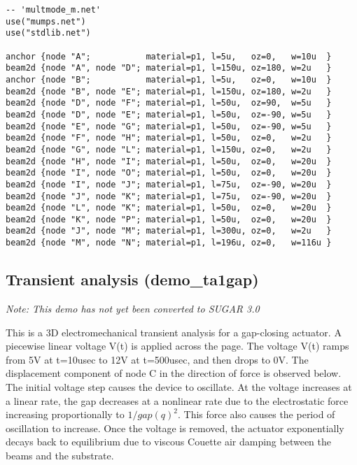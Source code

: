 \begin{verbatim}
-- 'multmode_m.net' 
use("mumps.net")
use("stdlib.net")

anchor {node "A";           material=p1, l=5u,   oz=0,   w=10u  }
beam2d {node "A", node "D"; material=p1, l=150u, oz=180, w=2u   }
anchor {node "B";           material=p1, l=5u,   oz=0,   w=10u  }
beam2d {node "B", node "E"; material=p1, l=150u, oz=180, w=2u   }
beam2d {node "D", node "F"; material=p1, l=50u,  oz=90,  w=5u   }
beam2d {node "D", node "E"; material=p1, l=50u,  oz=-90, w=5u   }
beam2d {node "E", node "G"; material=p1, l=50u,  oz=-90, w=5u   }
beam2d {node "F", node "H"; material=p1, l=50u,  oz=0,   w=2u   }
beam2d {node "G", node "L"; material=p1, l=150u, oz=0,   w=2u   }
beam2d {node "H", node "I"; material=p1, l=50u,  oz=0,   w=20u  }
beam2d {node "I", node "O"; material=p1, l=50u,  oz=0,   w=20u  }
beam2d {node "I", node "J"; material=p1, l=75u,  oz=-90, w=20u  }
beam2d {node "J", node "K"; material=p1, l=75u,  oz=-90, w=20u  }
beam2d {node "L", node "K"; material=p1, l=50u,  oz=0,   w=20u  }
beam2d {node "K", node "P"; material=p1, l=50u,  oz=0,   w=20u  }
beam2d {node "J", node "M"; material=p1, l=300u, oz=0,   w=2u   }
beam2d {node "M", node "N"; material=p1, l=196u, oz=0,   w=116u }
\end{verbatim}



                                                                                            
\subsection{Transient analysis (demo\_ta1gap)}

\emph{Note: This demo has not yet been converted to SUGAR 3.0}

This is a 3D electromechanical transient analysis for a gap-closing actuator. A
piecewise linear voltage V(t) is applied across the page. The voltage V(t)
ramps from 5V at t=10usec to 12V at t=500usec, and then drops to 0V. The
displacement component of node C in the direction of force is observed below.
The initial voltage step causes the device to oscillate. At the voltage
increases at a linear rate, the gap decreases at a nonlinear rate due to the
electrostatic force increasing proportionally to $1/\mathit{gap}(q)^2$. This
force also causes the period of oscillation to increase. Once the voltage is
removed, the actuator exponentially decays back to equilibrium due to viscous
Couette air damping between the beams and the substrate. 

